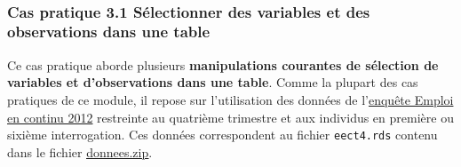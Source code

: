 \documentclass[12pt,twosided, notitlepage]{book}
\begin{document}
~

\hypertarget{cas-pratique-3.1-selectionner-des-variables-et-des-observations-dans-une-table}{%
\subsubsection{\texorpdfstring{\textbf{Cas pratique 3.1} Sélectionner
des variables et des observations dans une
table}{Cas pratique 3.1 Sélectionner des variables et des observations dans une table}}\label{cas-pratique-3.1-selectionner-des-variables-et-des-observations-dans-une-table}}


Ce cas pratique aborde plusieurs \textbf{manipulations courantes de
sélection de variables et d'observations dans une table}. Comme la
plupart des cas pratiques de ce module, il repose sur l'utilisation des
données de
l'\href{https://www.insee.fr/fr/metadonnees/source/s1223}{enquête Emploi
en continu 2012} restreinte au quatrième trimestre et aux individus en
première ou sixième interrogation. Ces données correspondent au fichier
\texttt{eect4.rds} contenu dans le fichier
\href{http://r.slmc.fr/donnees.zip}{\underline{donnees.zip}}.
\end{document}
